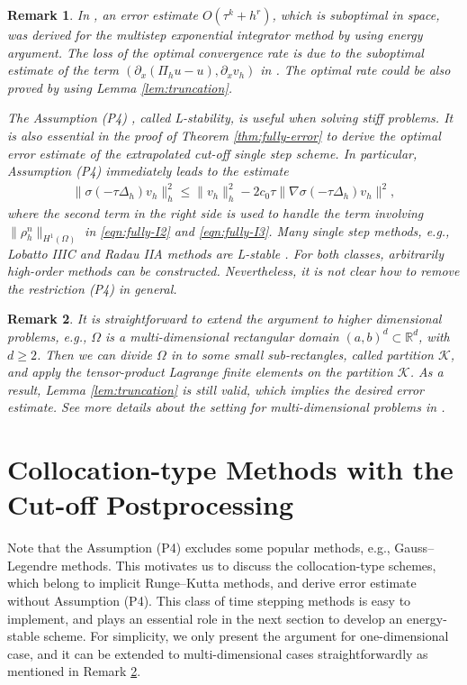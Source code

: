 \documentclass[a4paper, oneside]{book}
\def\bbR{{\mathbb{R}}}
\def\II{(\Omega)}
\def\bbR{\mathbb{R}}
\newtheorem{remark}{Remark}[section]
\begin{document}
\begin{remark}\label{rem:optimal-LiYangZhou}
In \cite{LiYangZhou:sisc}, an error estimate $O(\tau^k + h^r)$,
which is  suboptimal in space, was derived
for the multistep exponential integrator method by using energy argument.
The loss of the optimal convergence rate is due to the
suboptimal estimate of the term $(\partial_x(\Pi_h u  -  u), \partial_x v_h)$
in \cite[eq. (2.6) and (3.22)]{LiYangZhou:sisc}. The optimal rate could be also
proved by using Lemma \ref{lem:truncation}.


The Assumption (P4) , called
\textsl{L-stability}, is useful when solving stiff problems.
It is also essential in the proof of Theorem \ref{thm:fully-error} to derive the optimal error estimate
of the extrapolated cut-off single step scheme. In particular,
Assumption (P4) immediately leads to the estimate
\begin{align*}
 \|  \sigma(-\tau\Delta_h) v_h \|_h^2 \le \|  v_h \|_h^2 - 2c_0\tau \| \nabla \sigma(-\tau\Delta_h) v_h\|^2,
\end{align*}
where the second term in the right side is used to handle the term involving $\|  \rho_h^n \|_{H^1\II}$
in \eqref{eqn:fully-I2} and \eqref{eqn:fully-I3}.
Many single step methods, e.g., Lobatto IIIC and Radau IIA methods are L-stable \cite{Ehle:thesis,HairerWanner:2010}.
For both classes, arbitrarily high-order methods can be constructed.
Nevertheless, it is not clear how to remove the restriction (P4) in general.
\end{remark}

\begin{remark}\label{rem:highdimension}
It is straightforward to extend the argument to higher dimensional problems, e.g., $\Omega$ is
a multi-dimensional rectangular domain $(a, b)^d \subset\bbR^d$, with $d\ge 2$.
Then we can divide $\Omega$ in to some small sub-rectangles, called partition $\mathcal{K}$,
and  apply the tensor-product Lagrange finite elements on the partition $\mathcal{K}$.
As a result, Lemma \ref{lem:truncation} is still valid, which implies the desired error estimate.
See more details about the setting for multi-dimensional problems in \cite[Section 2.2]{LiYangZhou:sisc}.
\end{remark}



\section{Collocation-type Methods with the Cut-off Postprocessing}\label{sec:collocation}
Note that the Assumption (P4) excludes some
popular methods, e.g., Gauss--Legendre methods.
This motivates us to discuss the collocation-type schemes,
which belong to implicit Runge--Kutta methods, and derive error estimate without Assumption (P4).
This class of time stepping methods is easy to implement,
and plays an essential role in the next section to develop an energy-stable scheme.
For simplicity, we only present the argument for one-dimensional case,
and it can be extended to multi-dimensional cases straightforwardly as mentioned in Remark \ref{rem:highdimension}.
\end{document}
